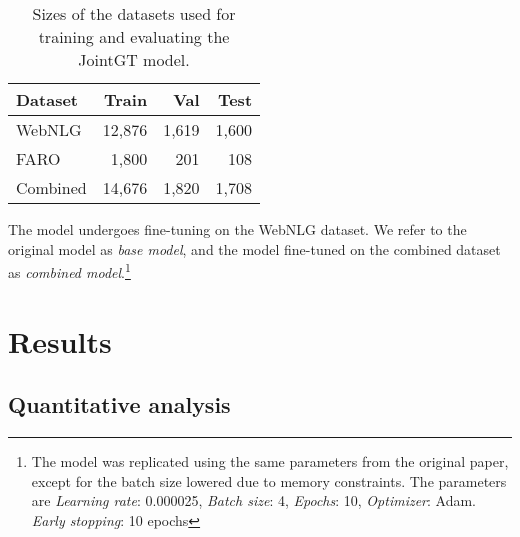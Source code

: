 \documentclass[
]{ceurart}
\begin{document}
\begin{table}[h]
	\caption{Sizes of the datasets used for training and evaluating the JointGT model.}
	\centering
	\begin{tabular}{|l|r|r|r|}
		\hline
		\textbf{Dataset} & \textbf{Train} & \textbf{Val} & \textbf{Test} \\ \hline
		WebNLG           & 12,876         & 1,619        & 1,600         \\ \hline
		FARO             & 1,800          & 201          & 108           \\ \hline
		Combined         & 14,676         & 1,820        & 1,708         \\ \hline
	\end{tabular}

	\label{tab:splits_dataset_jointgt}
\end{table}

The model undergoes fine-tuning on the WebNLG dataset. We refer to the original model as \textit{base model}, and the model fine-tuned on the combined dataset as \textit{combined model}.\footnote{The model was replicated using the same parameters from the original paper, except for the batch size lowered due to memory constraints. The parameters are \textit{Learning rate}: 0.000025, \textit{Batch size}: 4, \textit{Epochs}: 10, \textit{Optimizer}: Adam. \textit{Early stopping}: 10 epochs}

\section{Results}
\label{sec:results_jointGT}

\subsection{Quantitative analysis}

\end{document}
